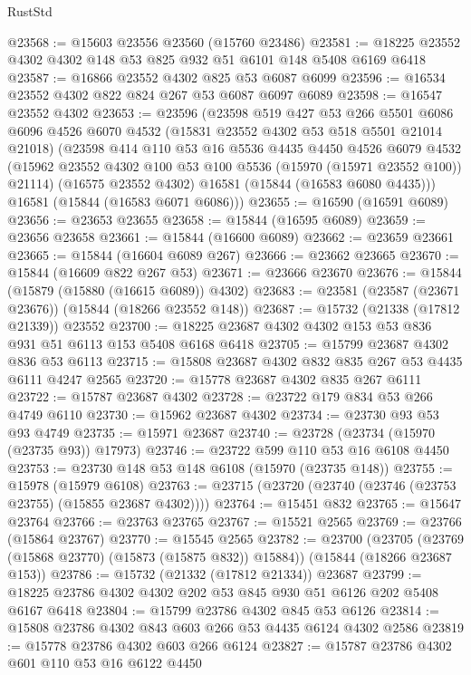 \begin{lexlean}{RustStd}
\begin{coremodule}
@23568 := @15603 @23556 @23560 (@15760 @23486)
@23581 := @18225 @23552 @4302 @4302 @148 @53 @825 @932 @51 @6101 @148 @5408 @6169 @6418
@23587 := @16866 @23552 @4302 @825 @53 @6087 @6099
@23596 := @16534 @23552 @4302 @822 @824 @267 @53 @6087 @6097 @6089
@23598 := @16547 @23552 @4302
@23653 := @23596
    (@23598
      @519
      @427
      @53
      @266
      @5501
      @6086
      @6096
      @4526
      @6070
      @4532
      (@15831 @23552 @4302 @53 @518 @5501 @21014 @21018)
      (@23598
        @414
        @110
        @53
        @16
        @5536
        @4435
        @4450
        @4526
        @6079
        @4532
        (@15962 @23552 @4302 @100 @53 @100 @5536 (@15970 (@15971 @23552 @100)) @21114)
        (@16575 @23552 @4302)
        @16581
        (@15844 (@16583 @6080 @4435)))
      @16581
      (@15844 (@16583 @6071 @6086)))
@23655 := @16590 (@16591 @6089)
@23656 := @23653 @23655
@23658 := @15844 (@16595 @6089)
@23659 := @23656 @23658
@23661 := @15844 (@16600 @6089)
@23662 := @23659 @23661
@23665 := @15844 (@16604 @6089 @267)
@23666 := @23662 @23665
@23670 := @15844 (@16609 @822 @267 @53)
@23671 := @23666 @23670
@23676 := @15844 (@15879 (@15880 (@16615 @6089)) @4302)
@23683 := @23581 (@23587 (@23671 @23676)) (@15844 (@18266 @23552 @148))
@23687 := @15732 (@21338 (@17812 @21339)) @23552
@23700 := @18225 @23687 @4302 @4302 @153 @53 @836 @931 @51 @6113 @153 @5408 @6168 @6418
@23705 := @15799 @23687 @4302 @836 @53 @6113
@23715 := @15808 @23687 @4302 @832 @835 @267 @53 @4435 @6111 @4247 @2565
@23720 := @15778 @23687 @4302 @835 @267 @6111
@23722 := @15787 @23687 @4302
@23728 := @23722 @179 @834 @53 @266 @4749 @6110
@23730 := @15962 @23687 @4302
@23734 := @23730 @93 @53 @93 @4749
@23735 := @15971 @23687
@23740 := @23728 (@23734 (@15970 (@23735 @93)) @17973)
@23746 := @23722 @599 @110 @53 @16 @6108 @4450
@23753 := @23730 @148 @53 @148 @6108 (@15970 (@23735 @148))
@23755 := @15978 (@15979 @6108)
@23763 := @23715 (@23720 (@23740 (@23746 (@23753 @23755) (@15855 @23687 @4302))))
@23764 := @15451 @832
@23765 := @15647 @23764
@23766 := @23763 @23765
@23767 := @15521 @2565
@23769 := @23766 (@15864 @23767)
@23770 := @15545 @2565
@23782 := @23700
    (@23705 (@23769 (@15868 @23770) (@15873 (@15875 @832)) @15884))
    (@15844 (@18266 @23687 @153))
@23786 := @15732 (@21332 (@17812 @21334)) @23687
@23799 := @18225 @23786 @4302 @4302 @202 @53 @845 @930 @51 @6126 @202 @5408 @6167 @6418
@23804 := @15799 @23786 @4302 @845 @53 @6126
@23814 := @15808 @23786 @4302 @843 @603 @266 @53 @4435 @6124 @4302 @2586
@23819 := @15778 @23786 @4302 @603 @266 @6124
@23827 := @15787 @23786 @4302 @601 @110 @53 @16 @6122 @4450

\end{coremodule}
\end{lexlean}
